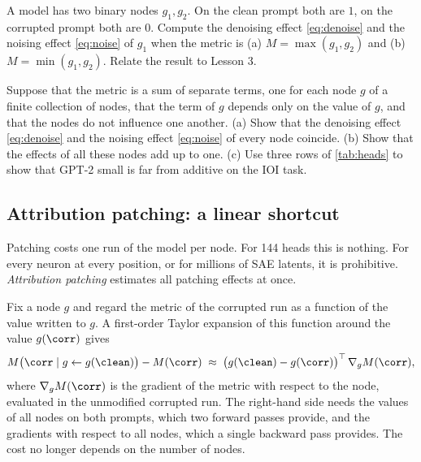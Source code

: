 \begin{exercise}\label{ex:andor}
A model has two binary nodes $g_1,g_2$. On the clean prompt both are $1$, on the corrupted prompt both are $0$.
Compute the denoising effect \eqref{eq:denoise} and the noising effect \eqref{eq:noise} of $g_1$ when the metric
is (a) $M=\max(g_1,g_2)$ and (b) $M=\min(g_1,g_2)$. Relate the result to Lesson 3.
\end{exercise}

\begin{exercise}\label{ex:additive}
Suppose that the metric is a sum of separate terms, one for each node $g$ of a finite collection of nodes, that
the term of $g$ depends only on the value of $g$, and that the nodes do not influence one another. (a) Show
that the denoising effect \eqref{eq:denoise} and the noising effect \eqref{eq:noise} of every node coincide.
(b) Show that the effects of all these nodes add up to one. (c) Use three rows of \cref{tab:heads} to
show that GPT-2 small is far from additive on the IOI task.
\end{exercise}

\subsection{Attribution patching: a linear shortcut}
\label{sec:attrpatching}

Patching costs one run of the model per node. For 144 heads this is nothing. For every neuron at every position,
or for millions of SAE latents, it is prohibitive. \emph{Attribution patching}
\citep{nanda2023attribution,syed2024attribution} estimates all patching effects at once.

Fix a node $g$ and regard the metric of the corrupted run as a function of the value written to $g$. A
first-order Taylor expansion of this function around the value $g(\corr)$ gives
\begin{equation}\label{eq:attrpatch}
M\big(\corr \mid g\leftarrow g(\clean)\big)-M(\corr) \;\approx\;
\big(g(\clean)-g(\corr)\big)^\top\,\nabla_gM(\corr),
\end{equation}
where $\nabla_gM(\corr)$ is the gradient of the metric with respect to the node, evaluated in the unmodified
corrupted run. The right-hand side needs the values of all nodes on both prompts, which two forward passes
provide, and the gradients with respect to all nodes, which a single backward pass provides. The cost no longer
depends on the number of nodes.

